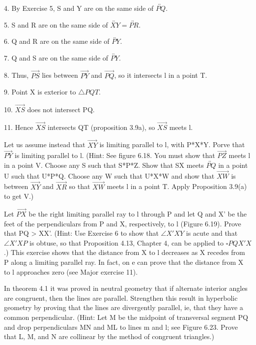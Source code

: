 \documentclass[12pt,letterpaper]{article}
\newcommand{\prob}[1]{\newpage\noindent {\bf #1}}
\begin{document}
4. By Exercise 5, S and Y are on the same side of $\overleftrightarrow{PQ}$.  

5. S and R are on the same side of $\overleftrightarrow{XY} = \overleftrightarrow{PR}.$

6. Q and R are on the same side of $\overleftrightarrow{PY}$.

7. Q and S are on the same side of $\overleftrightarrow{PY}$.

8. Thus, $\overrightarrow{PS}$ lies between $\overrightarrow{PY} $ and $\overrightarrow{PQ}$, so it intersects l in a point T.  

9. Point X is exterior to $\triangle PQT$.  

10. $\overrightarrow{XS}$ does not intersect PQ.  

11. Hence $\overrightarrow{XS}$ intersects QT (proposition 3.9a), so $\overrightarrow{XS}$ meets l. 




\prob{7 } Let us assume instead that $\overrightarrow{XY}$ is limiting parallel to l, with P*X*Y.  Porve that $\overrightarrow{PY}$ is limiting parallel to l.  (Hint: See figure 6.18.  You must show that $\overrightarrow{PZ}$ meets l in a point V.  Choose any S such that S*P*Z.  Show that SX meets $\overleftrightarrow{PQ}$ in a point U such that U*P*Q.  Choose any W such that U*X*W and show that $\overrightarrow{XW}$ is between $\overrightarrow{XY}$ and $\overrightarrow{XR}$ so that $\overrightarrow{XW}$ meets l in a point T.  Apply Proposition 3.9(a) to get V.)


\prob{8 } Let $\overrightarrow{PX}$ be the right limiting parallel ray to l through P and let Q and X' be the feet of the perpendiculars from P and X, respectively, to l (Figure 6.19).  Prove that PQ > XX'. (Hint: Use Exercise 6 to show that $\angle X'XY$ is acute and that $\angle X'XP$ is obtuse, so that Proposition 4.13, Chapter 4, can be applied to $\square PQX'X$.) This exercise shows that the distance from X to l decreases as X recedes from P along a limiting parallel ray.  In fact, on e can prove that the distance from X to l approaches zero (see Major exercise 11).



\prob{12 } In theorem 4.1 it was proved in neutral geometry that if alternate interior angles are congruent, then the lines are parallel.  Strengthen this result in hyperbolic geometry by proving that the lines are divergently parallel, ie, that they have a common perpendicular.  (Hint: Let M be the midpoint of transversal segment PQ and drop perpendiculars MN and ML to lines m and l;  see Figure 6.23.  Prove that L, M, and N are collinear by the method of congruent triangles.)
\end{document}
